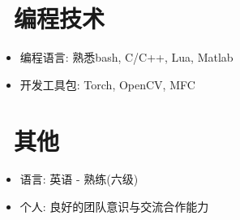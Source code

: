 \documentclass{resume}
\begin{document}
\begin{multicols}{2}
\section{\faTerminal\ 编程技术}
\begin{itemize}[parsep=0.5ex]
  \item 编程语言: 熟悉bash, C/C++, Lua, Matlab
  \item 开发工具包: Torch, OpenCV, MFC
\end{itemize}

\section{\faInfo\ 其他}
\begin{itemize}[parsep=0.5ex]
  \item 语言: 英语 - 熟练(六级)
  \item 个人: 良好的团队意识与交流合作能力
\end{itemize}

\end{multicols}
\end{document}

